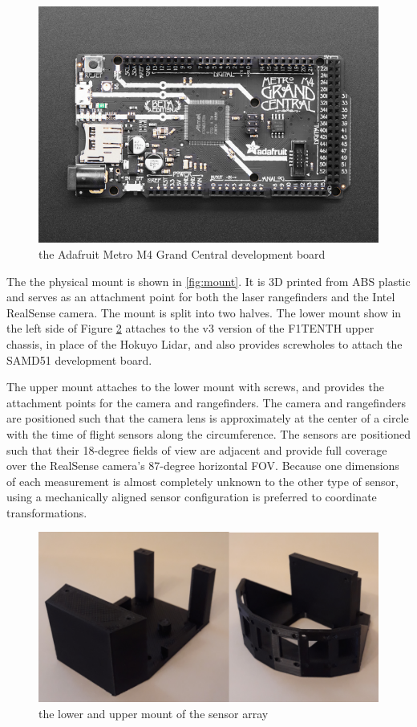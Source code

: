 \documentclass[conference]{IEEEtran}
\begin{document}
\begin{figure}
\centering
\includegraphics[scale=0.31]{grand-central.png}
\caption{the Adafruit Metro M4 Grand Central development board}
\label{fig:grand-central}
\end{figure}

The the physical mount is shown in \ref{fig:mount}. It is 3D printed from ABS
plastic and serves as an attachment point for both the laser rangefinders and
the Intel RealSense camera. The mount is split into two halves. The lower mount
show in the left side of Figure \ref{fig:split-mount} attaches to the v3
version of the F1TENTH upper chassis, in place of the Hokuyo Lidar, and also
provides screwholes to attach the SAMD51 development board.

The upper mount attaches to the lower mount with screws, and provides the
attachment points for the camera and rangefinders. The camera and rangefinders
are positioned such that the camera lens is approximately at the center of a
circle with the time of flight sensors along the circumference. The sensors are
positioned such that their 18-degree fields of view are adjacent and provide
full coverage over the RealSense camera's 87-degree horizontal FOV. Because one
dimensions of each measurement is almost completely unknown to the other type
of sensor, using a mechanically aligned sensor configuration is preferred to
coordinate transformations.

\begin{figure}
\centering
\includegraphics[scale=0.20]{split-mount.png}
\caption{the lower and upper mount of the sensor array}
\label{fig:split-mount}
\end{figure}
\end{document}
